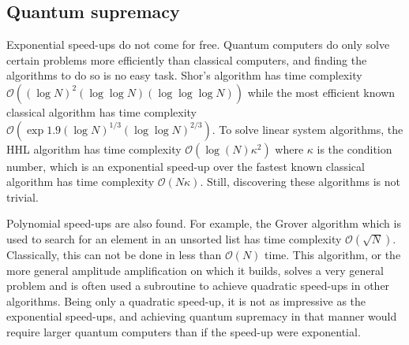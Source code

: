 \subsection{Quantum supremacy}
Exponential speed-ups do not come for free.
Quantum computers do only solve certain problems more efficiently than classical computers, and finding the algorithms to do so is no easy task.
Shor's algorithm has time complexity $\mathcal{O}((\log N)^2 (\log \log N) (\log \log \log N))$ while the most efficient known classical algorithm has time complexity $\mathcal{O}(\exp{1.9(\log N)^{1/3}(\log \log N)^{2/3}})$.
To solve linear system algorithms, the HHL algorithm has time complexity $\mathcal{O}(\log(N)\kappa^2)$ where $\kappa$ is the condition number, which is an exponential speed-up over the fastest known classical algorithm has time complexity $\mathcal{O}(N \kappa)$.
Still, discovering these algorithms is not trivial.

Polynomial speed-ups are also found.
For example, the Grover algorithm which is used to search for an element in an unsorted list has time complexity $\mathcal{O}(\sqrt{N})$.
Classically, this can not be done in less than $\mathcal{O}(N)$ time.
This algorithm, or the more general amplitude amplification on which it builds, solves a very general problem and is often used a subroutine to achieve quadratic speed-ups in other algorithms.
Being only a quadratic speed-up, it is not as impressive as the exponential speed-ups,
and achieving quantum supremacy in that manner would require larger quantum computers than if the speed-up were exponential.
